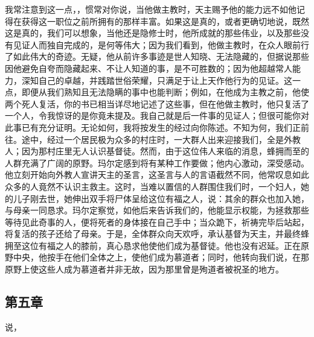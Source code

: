 我常注意到这一点，，惯常对你说，当他做主教时，天主赐予他的能力远不如他记得在获得这一职位之前所拥有的那样丰富。如果这是真的，或者更确切地说，既然这是真的，我们可以想象，当他还是隐修士时，他所成就的那些伟业，以及那些没有见证人而独自完成的，是何等伟大；因为我们看到，他做主教时，在众人眼前行了如此伟大的奇迹。无疑，他从前许多事迹是世人知晓、无法隐藏的，但据说那些因他避免自夸而隐藏起来、不让人知道的事，是不可胜数的；因为他超越常人能力，深知自己的卓越，并践踏世俗荣耀，只满足于让上天作他行为的见证。这一点，即便从我们熟知且无法隐瞒的事中也能判断；例如，在他成为主教之前，他使两个死人复活，你的书已相当详尽地记述了这些事，但在他做主教时，他只复活了一个人，令我惊讶的是你竟未提及。我自己就是后一件事的见证人；但很可能你对此事已有充分证明。无论如何，我将按发生的经过向你陈述。不知为何，我们正前往。途中，经过一个居民极为众多的村庄时，一大群人出来迎接我们，全是外教人；因为那村庄里无人认识基督徒。然而，由于这位伟人来临的消息，蜂拥而至的人群充满了广阔的原野。玛尔定感到将有某种工作要做；他内心激动，深受感动。他立刻开始向外教人宣讲天主的圣言，这圣言与人的言语截然不同，他常叹息如此众多的人竟然不认识主救主。这时，当难以置信的人群围住我们时，一个妇人，她的儿子刚去世，她伸出双手将尸体呈给这位有福之人，说：其余的群众也加入她，与母亲一同恳求。玛尔定察觉，如他后来告诉我们的，他能显示权能，为拯救那些等待见此奇事的人，便将死者的身体接在自己手中；当众跪下，祈祷完毕后站起，将复活的孩子还给了母亲。于是，全体群众向天欢呼，承认基督为天主，并最终蜂拥至这位有福之人的膝前，真心恳求他使他们成为基督徒。他也没有迟延。正在原野中央，他按手在他们全体之上，使他们成为慕道者；同时，他转向我们说，在那原野上使这些人成为慕道者并非无故，因为那里曾是殉道者被祝圣的地方。\par


\subsection{第五章}

说，\par


